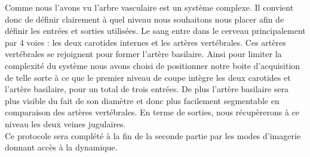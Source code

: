 Comme nous l’avons vu l’arbre vasculaire est un système complexe. Il convient donc de définir clairement à quel niveau nous souhaitons nous placer afin de définir les entrées et sorties utilisées. Le sang entre dans le cerveau principalement par 4 voies : les deux carotides internes et les artères vertébrales. Ces artères vertébrales se rejoignent pour former l’artère basilaire. Ainsi pour limiter la complexité du système nous avons choisi de positionner notre boite d’acquisition de telle sorte à ce que le premier niveau de coupe intègre les deux carotides et l’artère basilaire, pour un total de trois entrées. De plus l’artère basilaire sera plus visible du fait de son diamètre et donc plus facilement segmentable en comparaison des artères vertébrales. En terme de sorties, nous récupèrerons à ce niveau les deux veines jugulaires.\\
Ce protocole sera complété à la fin de la seconde partie par les modes d’imagerie donnant accès à la dynamique.





			
		
{}
